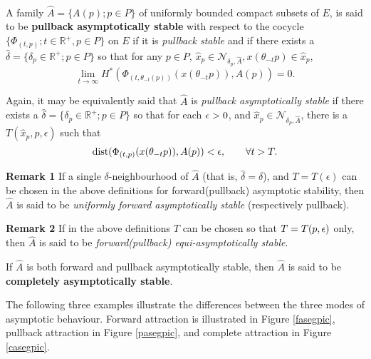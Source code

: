 \begin{defn}
   \label{PASdef} \hfill \\
   A family $\hat{A} = \{A(p) ; p \in P\}$ of uniformly bounded compact
   subsets of $E$, is said to be {\bf pullback asymptotically stable} with
   respect to the cocycle $\{\Phi_{(t,p)}; t \in \mathbb{R}^{+},p \in P\}$
   on $E$ if it is {\em pullback stable} and if there exists a
   $\hat{\delta} = \{\delta_p \in \mathbb{R}^+; p \in P\}$ so that for any
   $p \in P$, $\hat{x}_p \in \mathcal{N}_{\delta_p, \hat{A}},
   x(\theta_{-t}p) \in \hat{x}_p$,
   \begin{equation}\label{PASeq}
      \lim_{t \rightarrow \infty} H^{*}(\Phi_{(t,\theta_{-t}(p))}
      (x(\theta_{-t}p)),A(p)) = 0.
   \end{equation}
\end{defn}

Again, it may be equivalently said that $\hat{A}$ is {\em pullback
asymptotically stable} if there exists
a $\hat{\delta} = \{\delta_p \in \mathbb{R}^+; p \in P\}$ so that for each $\epsilon
> 0$, and $\hat{x}_p \in \mathcal{N}_{\delta_p, \hat{A}}$, there is a
$T(\hat{x}_p, p, \epsilon)$ such that
\[ {\rm dist}(\Phi_{(t,p)}(x(\theta_{-t}p)),A(p)) < \epsilon, \qquad \forall t > T. \]

{\bf Remark 1}
If a single $\delta$-neighbourhood of $\hat{A}$ (that is, $\hat{\delta} =
\delta$), and $T=T(\epsilon)$ can be chosen in the above definitions for
forward(pullback) asymptotic stability, then
$\hat{A}$ is said to be {\em uniformly forward asymptotically stable}
(respectively pullback).

{\bf Remark 2} If in the above definitions $T$ can be chosen so that $T=T(p,
\epsilon)$ only, then $\hat{A}$ is said to be {\em forward(pullback)
equi-asymptotically stable}.

\begin{defn}\label{CASdef}
  If $\hat{A}$ is both forward and pullback asymptotically stable, then
  $\hat{A}$ is said to be {\bf completely asymptotically stable}.
\end{defn}

The following three examples illustrate the differences between
the three modes of asymptotic behaviour. Forward attraction is
illustrated in Figure \ref{fasegpic}, pullback attraction in
Figure \ref{pasegpic}, and complete attraction in Figure
\ref{casegpic}.

